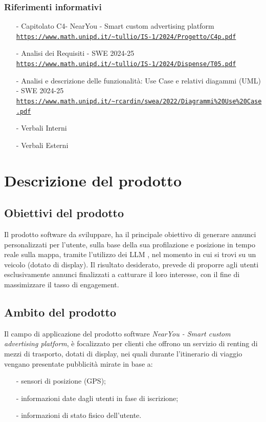\documentclass[11pt]{article}
\begin{document}
\begin{justify}
\subsubsection{Riferimenti informativi}
\begin{itemize}
    \item[-] Capitolato C4- NearYou - 
Smart custom advertising platform\\
    \textcolor{blue}{\texttt{\url{https://www.math.unipd.it/~tullio/IS-1/2024/Progetto/C4p.pdf}}}
    \item[-] Analisi dei Requisiti - SWE 2024-25\\
    \textcolor{blue}{\texttt{\url{https://www.math.unipd.it/~tullio/IS-1/2024/Dispense/T05.pdf}}}
    \item[-] Analisi e descrizione delle funzionalità: Use Case e relativi diagammi (UML) - SWE 2024-25\\    
    \textcolor{blue}{\texttt{\url{https://www.math.unipd.it/~rcardin/swea/2022/Diagrammi\%20Use\%20Case.pdf}}}
    \item[-] Verbali Interni
    \item[-] Verbali Esterni
    
\end{itemize}

\newpage
\section{Descrizione del prodotto}
\subsection{Obiettivi del prodotto}

Il prodotto software da sviluppare, ha il principale obiettivo di generare annunci personalizzati per l'utente, sulla base della sua profilazione e posizione in tempo reale sulla mappa, tramite l'utilizzo dei LLM , nel momento in cui si trovi su un veicolo (dotato di display). Il risultato desiderato, prevede di proporre agli utenti esclusivamente annunci finalizzati a catturare il loro interesse, con il fine di massimizzare il tasso di engagement.
\subsection{Ambito del prodotto}
Il campo di applicazione del prodotto software \textit{NearYou - 
Smart custom advertising platform}, è focalizzato per clienti che offrono un servizio di renting di mezzi di trasporto, dotati di display, nei quali durante l'itinerario di viaggio vengano presentate pubblicità mirate in base a:
\begin{itemize}
    \item [-] sensori di posizione (GPS);
    \item [-] informazioni date dagli utenti in fase di iscrizione;
    \item [-] informazioni di stato fisico dell’utente.
\end{itemize}


\end{justify}
\end{document}
